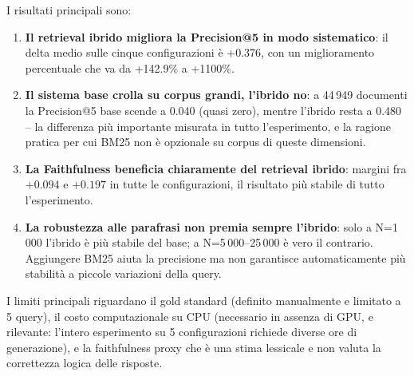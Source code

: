 \documentclass[12pt,a4paper]{article}
\begin{document}
I risultati principali sono:

\begin{enumerate}
  \item \textbf{Il retrieval ibrido migliora la Precision@5 in modo sistematico}: il delta medio sulle cinque configurazioni \`e +0.376, con un miglioramento percentuale che va da +142.9\% a +1100\%.

  \item \textbf{Il sistema base crolla su corpus grandi, l'ibrido no}: a 44\,949 documenti la Precision@5 base scende a 0.040 (quasi zero), mentre l'ibrido resta a 0.480 -- la differenza pi\`u importante misurata in tutto l'esperimento, e la ragione pratica per cui BM25 non \`e opzionale su corpus di queste dimensioni.

  \item \textbf{La Faithfulness beneficia chiaramente del retrieval ibrido}: margini fra $+0.094$ e $+0.197$ in tutte le configurazioni, il risultato pi\`u stabile di tutto l'esperimento.

  \item \textbf{La robustezza alle parafrasi non premia sempre l'ibrido}: solo a N=1\,000 l'ibrido \`e pi\`u stabile del base; a N=5\,000--25\,000 \`e vero il contrario. Aggiungere BM25 aiuta la precisione ma non garantisce automaticamente pi\`u stabilit\`a a piccole variazioni della query.
\end{enumerate}

I limiti principali riguardano il gold standard (definito manualmente e limitato a 5 query), il costo computazionale su CPU (necessario in assenza di GPU, e rilevante: l'intero esperimento su 5 configurazioni richiede diverse ore di generazione), e la faithfulness proxy che \`e una stima lessicale e non valuta la correttezza logica delle risposte.
\end{document}
